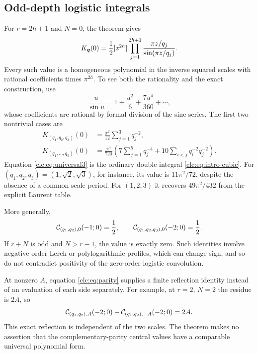 \subsection{Odd-depth logistic integrals}
For $r=2h+1$ and $N=0$, the theorem gives
\begin{equation}\label{clc:eq:odd-depth}
 K_{\boldsymbol q}(0)=\frac12[z^{2h}]
                   \prod_{j=1}^{2h+1}\frac{\pi z/q_j}{\sin(\pi z/q_j)}.
\end{equation}
Every such value is a homogeneous polynomial in the inverse squared
scales with rational coefficients times $\pi^{2h}$.
To see both the rationality and the exact construction, use
\[
 \frac{u}{\sin u}=1+\frac{u^2}{6}+\frac{7u^4}{360}+\cdots,
\]
whose coefficients are rational by formal division of the sine series.
The first two nontrivial cases are
\begin{align}
 K_{(q_1,q_2,q_3)}(0)
   &=\frac{\pi^2}{12}\sum_{j=1}^3q_j^{-2},
 \label{clc:eq:universal3}\\
 K_{(q_1,\ldots,q_5)}(0)
   &=\frac{\pi^4}{720}
       \left(7\sum_{j=1}^5q_j^{-4}
               +10\sum_{i<j}q_i^{-2}q_j^{-2}\right).
 \label{clc:eq:universal5}
\end{align}
Equation \eqref{clc:eq:universal3} is the ordinary double integral
\eqref{clc:eq:intro-cubic}. For $(q_1,q_2,q_3)=(1,\sqrt2,\sqrt3)$,
for instance, its value is $11\pi^2/72$, despite the absence of a
common scale period. For $(1,2,3)$ it recovers $49\pi^2/432$ from the
explicit Laurent table.

More generally,
\begin{equation}\label{clc:eq:negative-examples}
 \mathcal C_{(q_1,q_2),0}(-1;0)=\frac12,\qquad
 \mathcal C_{(q_1,q_2,q_3),0}(-2;0)=\frac12.
\end{equation}
If $r+N$ is odd and $N>r-1$, the value is exactly zero.
Such identities involve negative-order Lerch or polylogarithmic
profiles, which can change sign, and so do not contradict positivity
of the zero-order logistic convolution.

At nonzero $A$, equation \eqref{clc:eq:parity} supplies a finite
reflection identity instead of an evaluation of each side separately.
For example, at $r=2$, $N=2$ the residue is $2A$, so
\[
 \mathcal C_{(q_1,q_2),A}(-2;0)-\mathcal C_{(q_1,q_2),-A}(-2;0)=2A.
\]
This exact reflection is independent of the two scales. The theorem
makes no assertion that the complementary-parity central values have
a comparable universal polynomial form.
